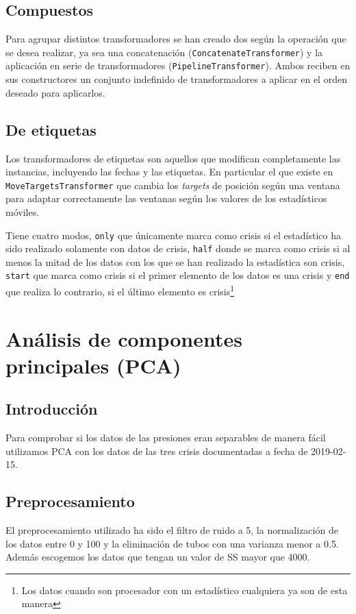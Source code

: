 \documentclass[a4paper,12pt,twoside,oldfontcommands]{memoir}
\begin{document}
	\section{Compuestos}
	Para agrupar distintos transformadores se han creado dos según la operación que se desea realizar, ya sea una concatenación (\texttt{ConcatenateTransformer}) y la aplicación en serie de transformadores (\texttt{PipelineTransformer}). Ambos reciben en sus constructores un conjunto indefinido de transformadores a aplicar en el orden deseado para aplicarlos.
	\section{De etiquetas}
	Los transformadores de etiquetas son aquellos que modifican completamente las instancias, incluyendo las fechas y las etiquetas. En particular el que existe en \texttt{MoveTargetsTransformer} que cambia los \textit{targets} de posición según una ventana para adaptar correctamente las ventanas según los valores de los estadísticos móviles.
	
	
	Tiene cuatro modos, \texttt{only} que únicamente marca como crisis si el estadístico ha sido realizado solamente con datos de crisis, \texttt{half} donde se marca como crisis si al menos la mitad de los datos con los que se han realizado la estadística son crisis, \texttt{start} que marca como crisis si el primer elemento de los datos es una crisis y \texttt{end} que realiza lo contrario, si el último elemento es crisis\footnote{Los datos cuando son procesador con un estadístico cualquiera ya son de esta manera}
	\chapter{Análisis de componentes principales (PCA)}
	\section{Introducción}
	
	Para comprobar si los datos de las presiones eran separables de manera fácil utilizamos PCA con los datos de las tres crisis documentadas a fecha de 2019-02-15.
	
	\section{Preprocesamiento}
	El preprocesamiento utilizado ha sido el filtro de ruido a 5, la normalización de los datos entre 0 y 100 y la eliminación de tubos con una varianza menor a 0.5. Además escogemos los datos que tengan un valor de SS mayor que 4000.
	
\end{document}

